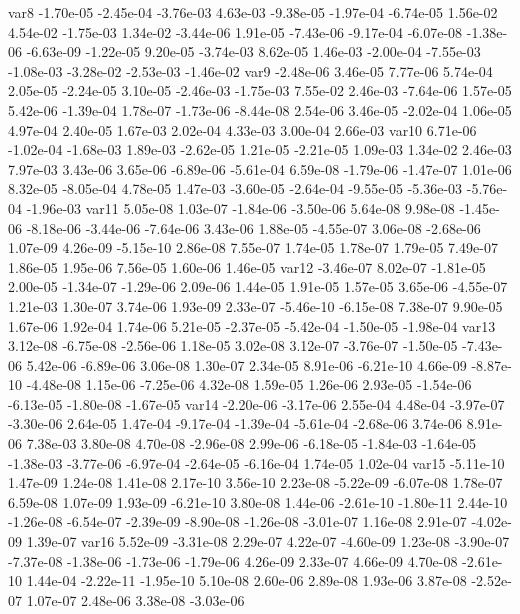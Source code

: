 var8 -1.70e-05 -2.45e-04 -3.76e-03  4.63e-03 -9.38e-05 -1.97e-04 -6.74e-05  1.56e-02  4.54e-02 -1.75e-03  1.34e-02 -3.44e-06  1.91e-05 -7.43e-06 -9.17e-04 -6.07e-08 -1.38e-06 -6.63e-09 -1.22e-05  9.20e-05 -3.74e-03  8.62e-05  1.46e-03 -2.00e-04 -7.55e-03 -1.08e-03 -3.28e-02 -2.53e-03 -1.46e-02
var9 -2.48e-06  3.46e-05  7.77e-06  5.74e-04  2.05e-05 -2.24e-05  3.10e-05 -2.46e-03 -1.75e-03  7.55e-02  2.46e-03 -7.64e-06  1.57e-05  5.42e-06 -1.39e-04  1.78e-07 -1.73e-06 -8.44e-08  2.54e-06  3.46e-05 -2.02e-04  1.06e-05  4.97e-04  2.40e-05  1.67e-03  2.02e-04  4.33e-03  3.00e-04  2.66e-03
var10  6.71e-06 -1.02e-04 -1.68e-03  1.89e-03 -2.62e-05  1.21e-05 -2.21e-05  1.09e-03  1.34e-02  2.46e-03  7.97e-03  3.43e-06  3.65e-06 -6.89e-06 -5.61e-04  6.59e-08 -1.79e-06 -1.47e-07  1.01e-06  8.32e-05 -8.05e-04  4.78e-05  1.47e-03 -3.60e-05 -2.64e-04 -9.55e-05 -5.36e-03 -5.76e-04 -1.96e-03
var11  5.05e-08  1.03e-07 -1.84e-06 -3.50e-06  5.64e-08  9.98e-08 -1.45e-06 -8.18e-06 -3.44e-06 -7.64e-06  3.43e-06  1.88e-05 -4.55e-07  3.06e-08 -2.68e-06  1.07e-09  4.26e-09 -5.15e-10  2.86e-08  7.55e-07  1.74e-05  1.78e-07  1.79e-05  7.49e-07  1.86e-05  1.95e-06  7.56e-05  1.60e-06  1.46e-05
var12 -3.46e-07  8.02e-07 -1.81e-05  2.00e-05 -1.34e-07 -1.29e-06  2.09e-06  1.44e-05  1.91e-05  1.57e-05  3.65e-06 -4.55e-07  1.21e-03  1.30e-07  3.74e-06  1.93e-09  2.33e-07 -5.46e-10 -6.15e-08  7.38e-07  9.90e-05  1.67e-06  1.92e-04  1.74e-06  5.21e-05 -2.37e-05 -5.42e-04 -1.50e-05 -1.98e-04
var13  3.12e-08 -6.75e-08 -2.56e-06  1.18e-05  3.02e-08  3.12e-07 -3.76e-07 -1.50e-05 -7.43e-06  5.42e-06 -6.89e-06  3.06e-08  1.30e-07  2.34e-05  8.91e-06 -6.21e-10  4.66e-09 -8.87e-10 -4.48e-08  1.15e-06 -7.25e-06  4.32e-08  1.59e-05  1.26e-06  2.93e-05 -1.54e-06 -6.13e-05 -1.80e-08 -1.67e-05
var14 -2.20e-06 -3.17e-06  2.55e-04  4.48e-04 -3.97e-07 -3.30e-06  2.64e-05  1.47e-04 -9.17e-04 -1.39e-04 -5.61e-04 -2.68e-06  3.74e-06  8.91e-06  7.38e-03  3.80e-08  4.70e-08 -2.96e-08  2.99e-06 -6.18e-05 -1.84e-03 -1.64e-05 -1.38e-03 -3.77e-06 -6.97e-04 -2.64e-05 -6.16e-04  1.74e-05  1.02e-04
var15 -5.11e-10  1.47e-09  1.24e-08  1.41e-08  2.17e-10  3.56e-10  2.23e-08 -5.22e-09 -6.07e-08  1.78e-07  6.59e-08  1.07e-09  1.93e-09 -6.21e-10  3.80e-08  1.44e-06 -2.61e-10 -1.80e-11  2.44e-10 -1.26e-08 -6.54e-07 -2.39e-09 -8.90e-08 -1.26e-08 -3.01e-07  1.16e-08  2.91e-07 -4.02e-09  1.39e-07
var16  5.52e-09 -3.31e-08  2.29e-07  4.22e-07 -4.60e-09  1.23e-08 -3.90e-07 -7.37e-08 -1.38e-06 -1.73e-06 -1.79e-06  4.26e-09  2.33e-07  4.66e-09  4.70e-08 -2.61e-10  1.44e-04 -2.22e-11 -1.95e-10  5.10e-08  2.60e-06  2.89e-08  1.93e-06  3.87e-08 -2.52e-07  1.07e-07  2.48e-06  3.38e-08 -3.03e-06
